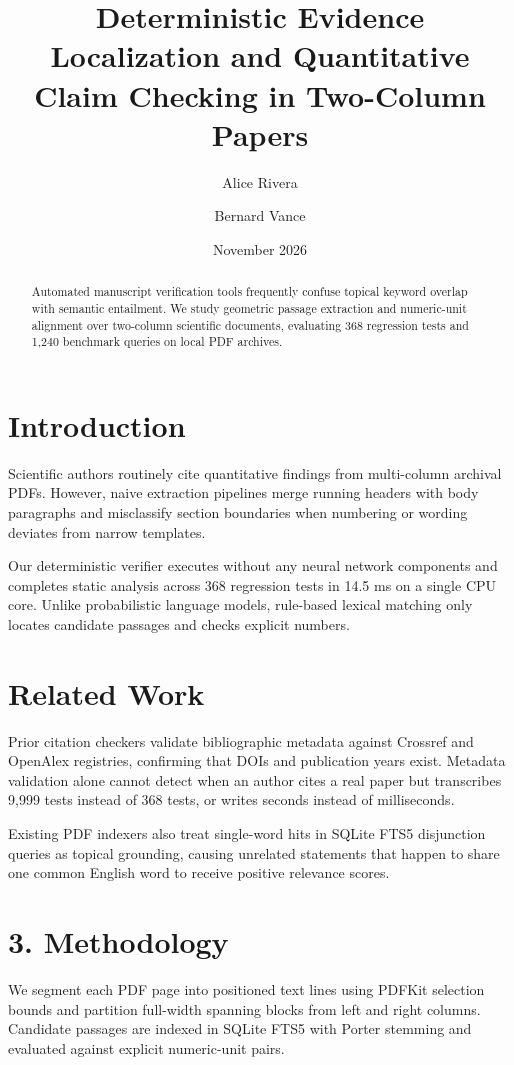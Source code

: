 \documentclass[10pt,twocolumn]{article}
\title{\textbf{Deterministic Evidence Localization and Quantitative Claim Checking in Two-Column Papers}}
\author{Alice Rivera \and Bernard Vance}
\date{November 2026}
\begin{document}
\maketitle
\thispagestyle{scholarhdr}

\begin{abstract}
Automated manuscript verification tools frequently confuse topical keyword overlap with semantic entailment. We study geometric passage extraction and numeric-unit alignment over two-column scientific documents, evaluating 368 regression tests and 1,240 benchmark queries on local PDF archives.
\end{abstract}

\section{Introduction}
Scientific authors routinely cite quantitative findings from multi-column archival PDFs. However, naive extraction pipelines merge running headers with body paragraphs and misclassify section boundaries when numbering or wording deviates from narrow templates.

Our deterministic verifier executes without any neural network components and completes static analysis across 368 regression tests in 14.5 ms on a single CPU core. Unlike probabilistic language models, rule-based lexical matching only locates candidate passages and checks explicit numbers.

\section{Related Work}
Prior citation checkers validate bibliographic metadata against Crossref and OpenAlex registries, confirming that DOIs and publication years exist. Metadata validation alone cannot detect when an author cites a real paper but transcribes 9,999 tests instead of 368 tests, or writes seconds instead of milliseconds.

Existing PDF indexers also treat single-word hits in SQLite FTS5 disjunction queries as topical grounding, causing unrelated statements that happen to share one common English word to receive positive relevance scores.

\section*{3. Methodology}
We segment each PDF page into positioned text lines using PDFKit selection bounds and partition full-width spanning blocks from left and right columns. Candidate passages are indexed in SQLite FTS5 with Porter stemming and evaluated against explicit numeric-unit pairs.
\end{document}
